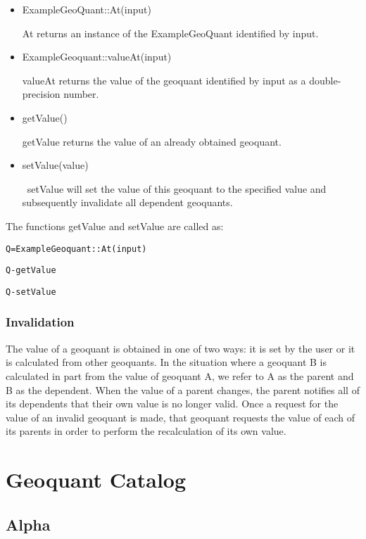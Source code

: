 \begin{itemize}
\item ExampleGeoQuant::At(input)

At returns an instance of the ExampleGeoQuant identified by input.

\item ExampleGeoquant::valueAt(input)

valueAt returns the value of the geoquant identified by input as a
double-precision number.

\item getValue()

getValue returns the value of an already obtained geoquant.

\item setValue(value)

\ setValue will set the value of this geoquant to the specified value and
subsequently invalidate all dependent geoquants.
\end{itemize}

The functions getValue and setValue are called as:

\texttt{Q=ExampleGeoquant::At(input)}

\texttt{Q-\TEXTsymbol{>}getValue}

\texttt{Q-\TEXTsymbol{>}setValue}

\subsubsection{Invalidation}

The value of a geoquant is obtained in one of two ways: it is set by the
user or it is calculated from other geoquants. In the situation where a
geoquant B is calculated in part from the value of geoquant A, we refer to A
as the parent and B as the dependent. When the value of a parent changes,
the parent notifies all of its dependents that their own value is no longer
valid. Once a request for the value of an invalid geoquant is made, that
geoquant requests the value of each of its parents in order to perform the
recalculation of its own value.

\section{Geoquant Catalog}

\subsection{Alpha}

